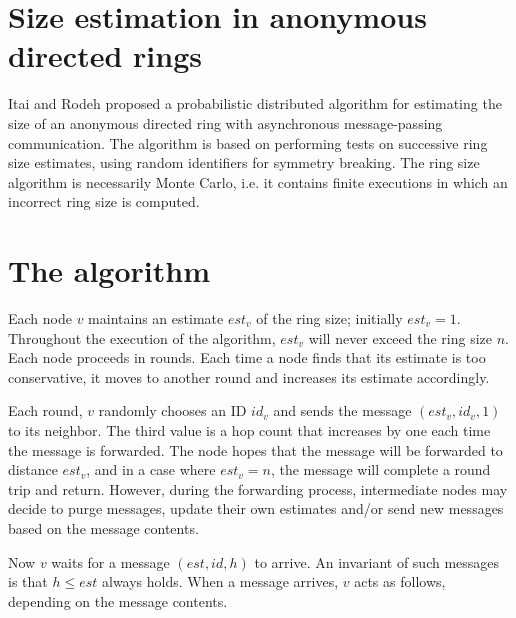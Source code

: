 \documentclass[a4paper,12pt]{article}
\begin{document}
\section{Size estimation in anonymous directed rings}
Itai and Rodeh \cite{Itai1990} proposed a probabilistic distributed algorithm for estimating the size of an anonymous directed ring with asynchronous message-passing communication. The algorithm is based on performing tests on successive ring size estimates, using random identifiers for symmetry breaking. The ring size algorithm is necessarily Monte Carlo, i.e. it contains finite executions in which an incorrect ring size is computed.

\section{The algorithm}
Each node $v$ maintains an estimate $est_{v}$ of the ring size; initially $est_{v} = 1$. Throughout the execution of the algorithm, $est_{v}$ will never exceed the ring size $n$. Each node proceeds in rounds. Each time a node finds that its estimate is too conservative, it moves to another round and increases its estimate accordingly.

Each round, $v$ randomly chooses an ID $id_{v}$ and sends the message $(est_{v},id_{v},1)$ to its neighbor. The third value is a hop count that increases by one each time the message is forwarded. The node hopes that the message will be forwarded to distance $est_{v}$, and in a case where $est_{v} = n$, the message will complete a round trip and return. However, during the forwarding process, intermediate nodes may decide to purge messages, update their own estimates and/or send new messages based on the message contents.

Now $v$ waits for a message $(est,id,h)$ to arrive. An invariant of such messages is that $h\leq est$ always holds. When a message arrives, $v$ acts as follows, depending on the message contents.
\end{document}
